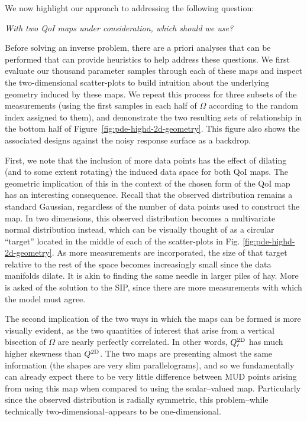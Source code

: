 We now highlight our approach to addressing the following question:
\begin{center}
\emph{With two QoI maps under consideration, which should we use?}
\end{center}

Before solving an inverse problem, there are a priori analyses that can be performed that can provide heuristics to help address these questions.
We first evaluate our thousand parameter samples through each of these maps and inspect the two-dimensional scatter-plots to build intuition about the underlying geometry induced by these maps.
We repeat this process for three subsets of the measurements (using the first samples in each half of $\Omega$ according to the random index assigned to them), and demonstrate the two resulting sets of relationship in the bottom half of Figure~\ref{fig:pde-highd-2d-geometry}.
This figure also shows the associated designs against the noisy response surface as a backdrop.

First, we note that the inclusion of more data points has the effect of dilating (and to some extent rotating) the induced data space for both QoI maps.
The geometric implication of this in the context of the chosen form of the QoI map has an interesting consequence.
Recall that the observed distribution remains a standard Gaussian, regardless of the number of data points used to construct the map.
In two dimensions, this observed distribution becomes a multivariate normal distribution instead, which can be visually thought of as a circular ``target'' located in the middle of each of the scatter-plots in Fig. \ref{fig:pde-highd-2d-geometry}.
As more measurements are incorporated, the size of that target relative to the rest of the space becomes increasingly small since the data manifolds dilate.
It is akin to finding the same needle in larger piles of hay.
More is asked of the solution to the SIP, since there are more measurements with which the model must agree.

The second implication of the two ways in which the maps can be formed is more visually evident, as the two quantities of interest that arise from a vertical bisection of $\Omega$ are nearly perfectly correlated.
In other words, $Q^\text{2D}_\prime$ has much higher skewness than $Q^\text{2D}$.
The two maps are presenting almost the same information (the shapes are very slim parallelograms), and so we fundamentally can already expect there to be very little difference between MUD points arising from using this map when compared to using the scalar--valued map.
Particularly since the observed distribution is radially symmetric, this problem\---while technically two-dimensional\---appears to be one-dimensional.

